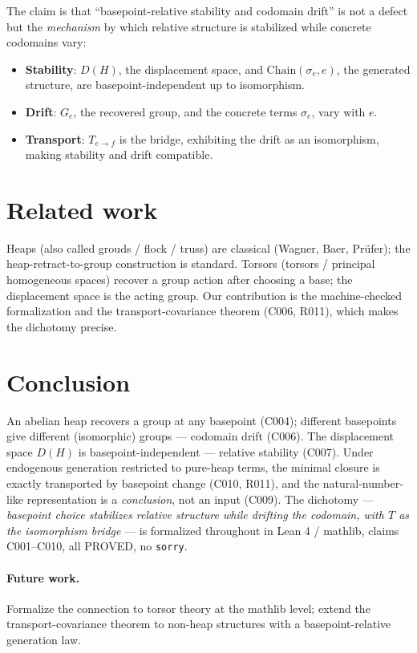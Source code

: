 \documentclass[sigplan,10pt,anonymous,review]{acmart}
\theoremstyle{remark}
\begin{document}
The claim is that ``basepoint-relative stability and codomain drift'' is not a defect
but the \textit{mechanism} by which relative structure is stabilized while concrete
codomains vary:
\begin{itemize}
\item \textbf{Stability}: $D(H)$, the displacement space, and
$\mathrm{Chain}(\sigma_e, e)$, the generated structure, are basepoint-independent up
to isomorphism.
\item \textbf{Drift}: $G_e$, the recovered group, and the concrete terms $\sigma_e$,
vary with $e$.
\item \textbf{Transport}: $T_{e \to f}$ is the bridge, exhibiting the drift as an
isomorphism, making stability and drift compatible.
\end{itemize}

\section{Related work}

Heaps (also called grouds / flock / truss) are classical (Wagner, Baer, Prüfer);
the heap-retract-to-group construction is standard. Torsors (torsors / principal
homogeneous spaces) recover a group action after choosing a base; the displacement
space is the acting group. Our contribution is the machine-checked formalization and
the transport-covariance theorem (C006, R011), which makes the dichotomy precise.

\section{Conclusion}

An abelian heap recovers a group at any basepoint (C004); different basepoints give
different (isomorphic) groups --- codomain drift (C006). The displacement space $D(H)$
is basepoint-independent --- relative stability (C007). Under endogenous generation
restricted to pure-heap terms, the minimal closure is exactly transported by basepoint
change (C010, R011), and the natural-number-like representation is a \textit{conclusion},
not an input (C009). The dichotomy --- \textit{basepoint choice stabilizes relative
structure while drifting the codomain, with $T$ as the isomorphism bridge} --- is
formalized throughout in Lean 4 / mathlib, claims C001--C010, all PROVED, no
\texttt{sorry}.

\paragraph{Future work.} Formalize the connection to torsor theory at the mathlib
level; extend the transport-covariance theorem to non-heap structures with a
basepoint-relative generation law.



\end{document}
